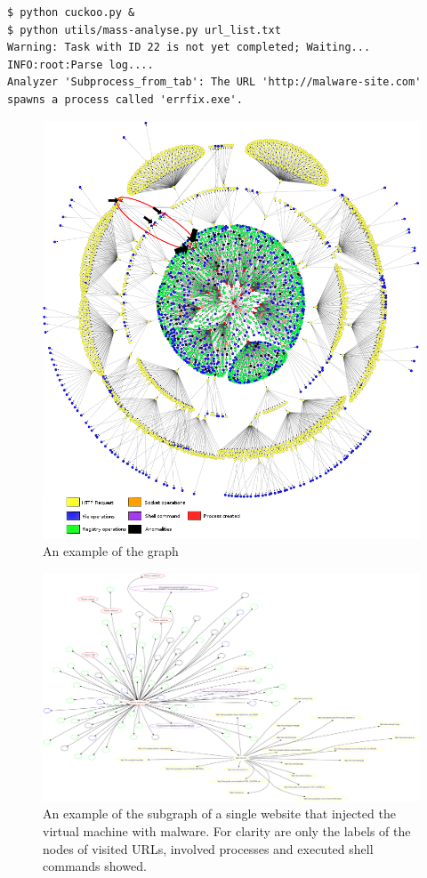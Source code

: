 \begin{lstlisting}
$ python cuckoo.py &
$ python utils/mass-analyse.py url_list.txt
Warning: Task with ID 22 is not yet completed; Waiting...
INFO:root:Parse log....
Analyzer 'Subprocess_from_tab': The URL 'http://malware-site.com' 
spawns a process called 'errfix.exe'.
\end{lstlisting}

\begin{figure}[h]
    \centering
    \centerline{\includegraphics[width=20cm]{Images/graph4.jpg}}
    \caption{An example of the graph}
    \label{fig:graph}
\end{figure}

\begin{figure}[h]
    \centering
    \includegraphics[width=25cm, angle=90]{Images/report_Subprocess_from_tab}
    \caption{An example of the subgraph of a single website that injected the virtual machine with malware. For clarity are only the labels of the nodes of visited URLs, involved processes and executed shell commands showed.}
    \label{fig:subgraph}
\end{figure}

